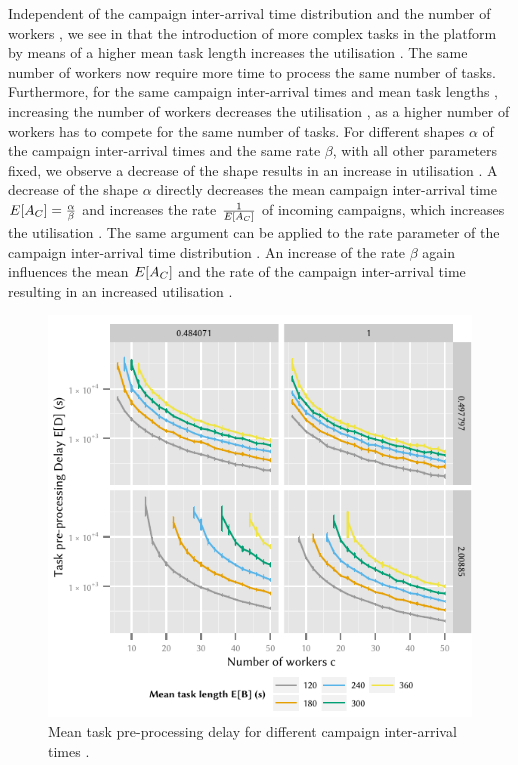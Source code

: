 Independent of the campaign inter-arrival time distribution \campaignIAT and the number of workers \numberOfWorkers, we see in  that the introduction of more complex tasks in the platform by means of a higher mean task length \meanTaskLength increases the utilisation \workerUtilization.
The same number of workers \numberOfWorkers now require more time to process the same number of tasks.
Furthermore, for the same campaign inter-arrival times \campaignIAT and mean task lengths \meanTaskLength, increasing the number of workers \numberOfWorkers decreases the utilisation \workerUtilization, as a higher number of workers has to compete for the same number of tasks.
For different shapes \(\alpha\) of the campaign inter-arrival times \campaignIAT and the same rate \(\beta\), with all other parameters fixed, we observe a decrease of the shape results in an increase in utilisation \workerUtilization.
A decrease of the shape \(\alpha\) directly decreases the mean campaign inter-arrival time \(E[A_C]=\frac{\alpha}{\beta}\) and increases the rate \(\frac{1}{E[A_C]}\) of incoming campaigns, which increases the utilisation \workerUtilization.
The same argument can be applied to the rate parameter of the campaign inter-arrival time distribution \campaignIAT.
An increase of the rate \(\beta\) again influences the mean \(E[A_C]\) and the rate of the campaign inter-arrival time \campaignIAT resulting in an increased utilisation \workerUtilization.

\begin{figure}
	\centering
	\includegraphics{cloud/crowdsourcing/numerical_evaluation/figures/parameter_task_delay}
	\caption{Mean task pre-processing delay \preTaskProcessingDelay for different campaign inter-arrival times \campaignIAT.}
	\label{fig:cloud:crowdsourcing:performance_evaluation:distributions:parameter_task_delay}
\end{figure}

